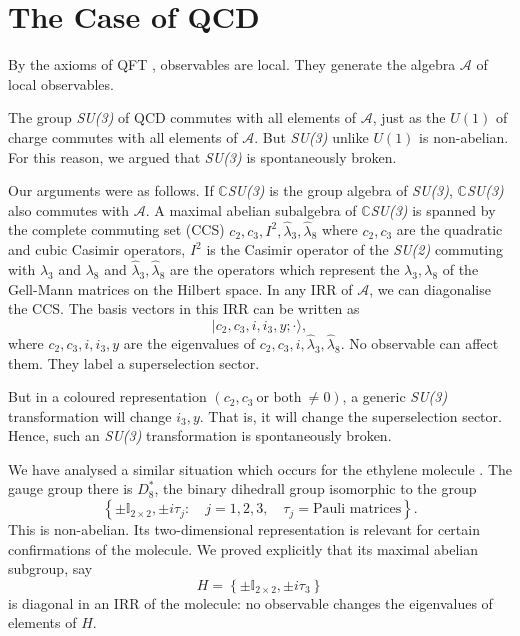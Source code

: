 \section{The Case of QCD}\label{chap4-sec3}

By the axioms of QFT \cite{chap4-key9}, observables are local. They generate the algebra $\mathcal{A}$ of local observables.

The group \textit{SU(3)} of QCD commutes with all elements of $\mathcal{A}$, just as the $U(1)$ of charge commutes with all elements of  $\mathcal{A}$. But \textit{SU(3)} unlike $U(1)$ is non-abelian. For this reason, we argued \cite{chap4-key1, chap4-key4} that \textit{SU(3)} is spontaneously broken.

Our arguments were as follows. If $\mathbb{C}$\textit{SU(3)} is the group algebra of \textit{SU(3)}, $\mathbb{C}$\textit{SU(3)} also commutes with $\mathcal{A}$. A maximal abelian subalgebra of $\mathbb{C}$\textit{SU(3)} is spanned by the complete commuting set (CCS) $c_2, c_3, I^{2}, \hat{\lambda}_3, \hat{\lambda}_8$ where $c_2, c_3$ are the quadratic and cubic Casimir operators, $I^{2}$ is the Casimir operator of the \textit{SU(2)} commuting with $\lambda_{3}$ and $\lambda_{8}$ and  $\hat{\lambda}_3, \hat{\lambda}_8$ are the operators which represent the ${\lambda}_3, {\lambda}_8$ of the Gell-Mann matrices on the Hilbert space. In any IRR of $\mathcal{A}$, we can diagonalise the CCS. The basis vectors in this IRR can be written as
\begin{equation}
  |c_2, c_3, i, i_3, y;\cdot \rangle,\label{chap4-eq3.1}
\end{equation}
where $c_2, c_3, i, i_3, y$ are the eigenvalues of $c_2, c_3, i, \hat{\lambda}_3, \hat{\lambda}_8$. No observable can affect them. They label a superselection sector.

But in a coloured representation $(c_2, c_3 ~\text{or both}~\neq 0)$, a generic \textit{SU(3)} transformation will change $i_3, y$. That is, it will change the superselection sector. Hence, such an \textit{SU(3)} transformation is spontaneously broken.

We have analysed a similar situation which occurs for the ethylene molecule \cite{chap4-key10}. The gauge group there is $D^\ast_8$, the binary dihedrall group isomorphic to the group
\begin{equation}
\left\{ \pm \mathbb{I}_{2 \times 2}, \pm i \tau_j :\quad j=1, 2, 3, \quad \tau_j = \text{Pauli matrices}\right\}.\label{chap4-eq3.2}
\end{equation}
This is non-abelian. Its two-dimensional representation is relevant for certain confirmations of the molecule. We proved explicitly that its maximal abelian subgroup, say
\begin{equation}
H = \left\{ \pm \mathbb{I}_{2 \times 2}, \pm  i \tau_3\right\}\label{chap4-eq3.3}
\end{equation}
is diagonal in an IRR of the molecule: no observable changes the eigenvalues of elements of $H$.

